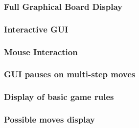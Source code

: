 \documentclass[a4paper,12pt]{scrartcl}
\begin{document}
{{			\subsubsection{Full Graphical Board Display}{}
			\subsubsection{Interactive GUI}{}
			\subsubsection{Mouse Interaction}{}
			\subsubsection{GUI pauses on multi-step moves}{}
			\subsubsection{Display of basic game rules}{}
			\subsubsection{Possible moves display}{}
		}
		
	}
	
	
	\newpage
	
	\printbibliography[heading=bibintoc,title=References]
\end{document}
